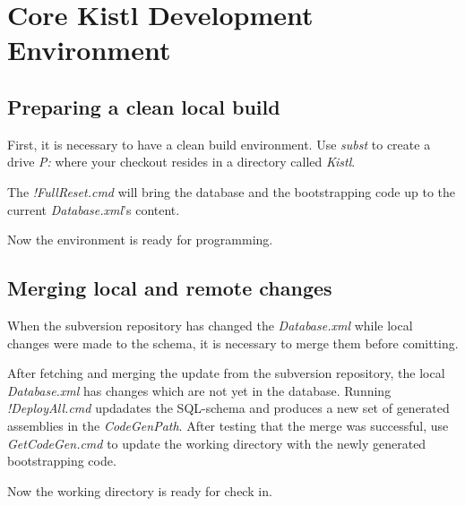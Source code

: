 

\section{Core Kistl Development Environment}

\subsection{Preparing a clean local build}

First, it is necessary to have a clean build environment. Use
\emph{subst} to create a drive \emph{P:} where your checkout
resides in a directory called \emph{Kistl}.

The \emph{!FullReset.cmd} will bring the database and the bootstrapping
code up to the current \emph{Database.xml}'s content.

Now the environment is ready for programming.

\subsection{Merging local and remote changes}

When the subversion repository has changed the \emph{Database.xml} while
local changes were made to the schema, it is necessary to merge them
before comitting.

After fetching and merging the update from the subversion repository,
the local \emph{Database.xml} has changes which are not yet in the
database. Running \emph{!DeployAll.cmd} updadates the SQL-schema and
produces a new set of generated assemblies in the \emph{CodeGenPath}.
After testing that the merge was successful, use \emph{GetCodeGen.cmd}
to update the working directory with the newly generated bootstrapping
code.

Now the working directory is ready for check in.



